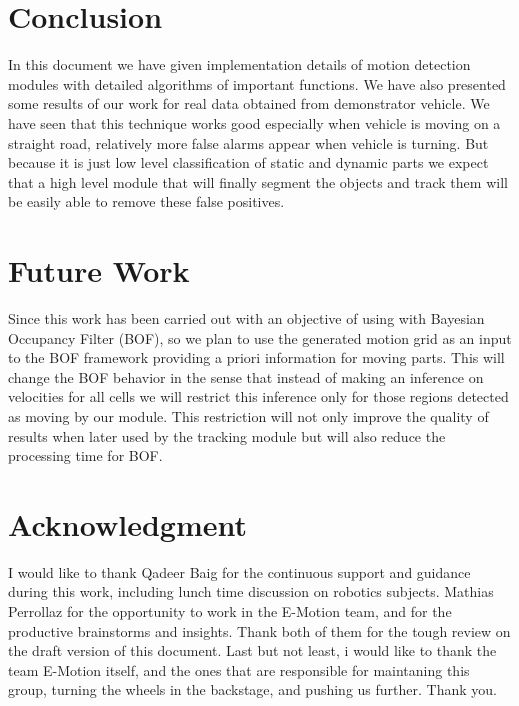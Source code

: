 \section{Conclusion}
In this document we have given implementation details of motion detection modules with detailed algorithms of important functions. We have also presented some results of our work for real data obtained from demonstrator vehicle. We have seen that this technique works good especially when vehicle is moving on a straight road, relatively more false alarms appear when vehicle is turning. But because it is just low level classification of static and dynamic parts we expect that a high level module that will finally segment the objects and track them will be easily able to remove these false positives.

\section{Future Work}
Since this work has been carried out with an objective of using with Bayesian Occupancy Filter (BOF), so we plan to use the generated motion grid as an input to the BOF framework providing a priori information for moving parts. This will change the BOF behavior in the sense that instead of making an inference on velocities for all cells we will restrict this inference only for those regions detected as moving by our module. This restriction will not only improve the quality of results when later used by the tracking module but will also reduce the processing time for BOF.

\section{Acknowledgment}

I would like to thank Qadeer Baig for the continuous support and guidance during this work, including lunch time discussion on robotics subjects. Mathias Perrollaz for the opportunity to work in the E-Motion team, and for the productive brainstorms and insights. Thank both of them for the tough review on the draft version of this document. Last but not least, i would like to thank the team E-Motion itself, and the ones that are responsible for maintaning this group, turning the wheels in the backstage, and pushing us further. Thank you.